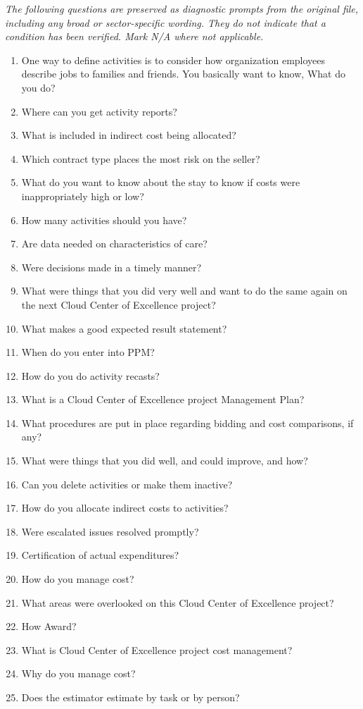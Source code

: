 \documentclass[10pt,letterpaper]{article}
\newcommand{\docsection}[1]{\par\Needspace{5\baselineskip}\vspace{8pt}{\large\sffamily\bfseries\color{navy}#1}\par\vspace{2pt}{\color{rulegrey}\rule{\linewidth}{.6pt}}\par}
\begin{document}
\docsection{03 \quad Source diagnostic checklist}
\textit{The following questions are preserved as diagnostic prompts from the original file, including any broad or sector-specific wording. They do not indicate that a condition has been verified. Mark N/A where not applicable.}
\begingroup\small\begin{enumerate}[leftmargin=2.1em, itemsep=4pt]
\item[1.] One way to define activities is to consider how organization employees describe jobs to families and friends. You basically want to know, What do you do?
\item[2.] Where can you get activity reports?
\item[3.] What is included in indirect cost being allocated?
\item[4.] Which contract type places the most risk on the seller?
\item[5.] What do you want to know about the stay to know if costs were inappropriately high or low?
\item[6.] How many activities should you have?
\item[7.] Are data needed on characteristics of care?
\item[8.] Were decisions made in a timely manner?
\item[9.] What were things that you did very well and want to do the same again on the next Cloud Center of Excellence project?
\item[10.] What makes a good expected result statement?
\item[11.] When do you enter into PPM?
\item[12.] How do you do activity recasts?
\item[13.] What is a Cloud Center of Excellence project Management Plan?
\item[14.] What procedures are put in place regarding bidding and cost comparisons, if any?
\item[15.] What were things that you did well, and could improve, and how?
\item[16.] Can you delete activities or make them inactive?
\item[17.] How do you allocate indirect costs to activities?
\item[18.] Were escalated issues resolved promptly?
\item[19.] Certification of actual expenditures?
\item[20.] How do you manage cost?
\item[21.] What areas were overlooked on this Cloud Center of Excellence project?
\item[22.] How Award?
\item[23.] What is Cloud Center of Excellence project cost management?
\item[24.] Why do you manage cost?
\item[25.] Does the estimator estimate by task or by person?
\end{enumerate}\endgroup
\end{document}
